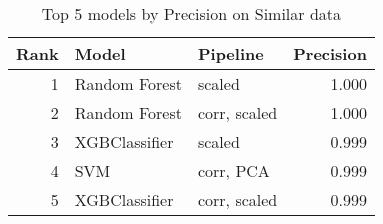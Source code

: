 \begin{table}[!htb]
\centering
\begin{tabular}{rllr}
\toprule
Rank & Model & Pipeline & Precision \\
\midrule
1 & Random Forest & scaled & 1.000 \\
2 & Random Forest & corr, scaled & 1.000 \\
3 & XGBClassifier & scaled & 0.999 \\
4 & SVM & corr, PCA & 0.999 \\
5 & XGBClassifier & corr, scaled & 0.999 \\
\bottomrule
\end{tabular}
\caption{Top 5 models by Precision on Similar data}
\label{table-top-5-precision-similar}
\end{table}
